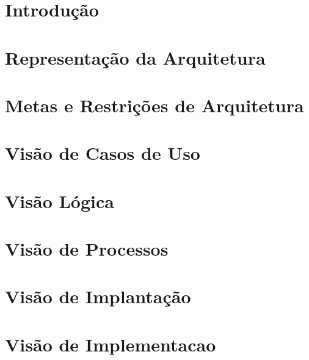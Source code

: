 \section{Introdução} %
\label{sec:introdu_o}
 

\section{Representação da Arquitetura} %
\label{sec:representacao_da_arquitetura}


\section{Metas e Restrições de Arquitetura} %
\label{sec:metas_e_restricoes_de_arquitetura}
 

\section{Visão de Casos de Uso} %
\label{sec:visao_de_casos_de_uso}
 

\section{Visão Lógica} %
\label{sec:visao_logica}
 

\section{Visão de Processos} %
\label{sec:visao_de_processos}
 

\section{Visão de Implantação} %
\label{sec:visao_de_implantacao}


\section{Visão de Implementacao} %
\label{sec:visao_de_implementacao}


